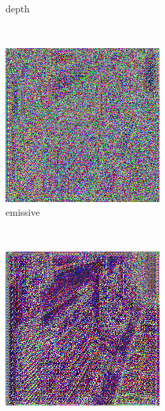 \begin{figure}[h!]
\begin{subfigure}[b]{0.175\textwidth}
     \caption{depth}
    \end{subfigure}
    ~
    \begin{subfigure}[b]{0.175\textwidth}
     \includegraphics[width=\textwidth]{figures/result/single/emissive/1.png}
     \caption{emissive}
    \end{subfigure}
    ~
    \begin{subfigure}[b]{0.175\textwidth}
     \includegraphics[width=\textwidth]{figures/result/single/metalness/1.png}

\end{subfigure}
\end{figure}
